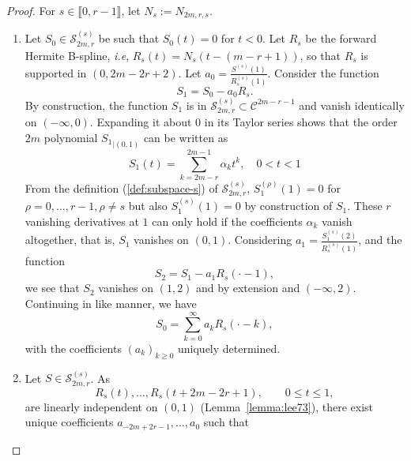 \begin{proof} For $s\in \llbracket0,r-1\rrbracket$, let $N_s := N_{2m,r,s}$.
  \begin{enumerate}
    \item Let $S_0 \in \mathscr{S}_{2m,r}^{(s)}$ be such that $S_0(t) = 0$ for $t < 0$. Let $R_s$ be the forward Hermite 
      B-spline, \textit{i.e}, $R_s(t) = N_s(t-(m-r+1))$, so that $R_s$ is supported in $(0, 2m-2r+2)$. Let $a_0 = 
      \frac{S^{(s)}(1)}{R_s^{(s)}(1)}$. Consider the function
      \begin{equation*}
	S_1 = S_0 - a_0 R_s.
      \end{equation*}
      By construction, the function $S_1$ is in $\mathscr{S}_{2m,r}^{(s)} \subset \mathcal{C}^{2m-r-1}$ and vanish 
      identically on $(-\infty, 0)$.  Expanding it about 0 in its Taylor series shows that the order $2m$ polynomial 
      ${S_1}_{|(0,1)}$ can be written as
      \begin{equation*}
	S_1(t) = \sum_{k=2m-r}^{2m-1} \alpha_{k} t^k, \quad 0 < t < 1
      \end{equation*}
      From the definition (\ref{def:subspace-s}) of $\mathscr{S}_{2m,r}^{(s)}$, $S_1^{(\rho)}(1) = 0$ for $\rho=0, 
      \ldots, r-1, \rho \neq s$ but also $S_1^{(s)}(1) = 0$ by construction of $S_1$. These $r$ vanishing derivatives at 
      $1$ can only hold if the coefficients $\alpha_{k}$ vanish altogether, that is, $S_1$ vanishes on $(0,1)$.  
      Considering $a_1 = \frac{S_1^{(s)}(2)}{R_s^{(s)}(1)}$, and the function
      \begin{equation*}
	S_2 = S_1 - a_1 R_s(\cdot-1),
      \end{equation*}
      we see that $S_2$ vanishes on $(1,2)$ and by extension and $(-\infty, 2)$. Continuing in like manner, we have
      \begin{equation*}
	S_0 = \sum_{k=0}^{\infty} a_k R_s(\cdot-k),
      \end{equation*}
      with the coefficients ${(a_k)}_{k \geq 0}$ uniquely determined. \\
    \item Let $S \in \mathscr{S}_{2m,r}^{(s)}$. As 
      \begin{equation*}
	R_s(t), \ldots, R_s(t+2m-2r+1), \qquad 0 \leq t \leq 1,
      \end{equation*}
      are linearly independent on $(0,1)$ (Lemma~\ref{lemma:lee73}), there exist unique coefficients $a_{-2m+2r-1}, 
      \ldots, a_0$ such that
      \begin{equation*}

\end{equation*}
\end{enumerate}
\end{proof}
